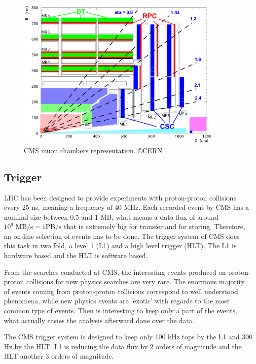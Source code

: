 \begin{figure}[!Hhtbp]
  \begin{center}
    \includegraphics[width=0.9\textwidth]{figs/MuonDetector.png}
    \caption{CMS muon chambers representation. \copyright CERN}
    \label{fig:cmsmuon}
  \end{center}
\end{figure}

\subsection{Trigger}
\label{sec:trigger}

LHC has been designed to provide experiments with proton-proton collisions every 25 ns, meaning a frequency of 40 MHz. Each recorded event by CMS has a nominal size between 0.5 and 1 MB, what means a data flux of around $10^{9}\; \text{MB/s}= 1\text{PB/s}$ that is extremely big for transfer and for storing. Therefore, an on-line selection of events has to be done. The trigger system of CMS does this task in two fold, a level 1 (L1) and a high level trigger (HLT). The L1 is hardware based and the HLT is software based. 

From the searches conducted at CMS, the interesting events produced on proton-proton collisions for new physics searches are very rare. The enormous majority of events coming from proton-proton collisions correspond to well understood phenomena, while new physics events are 'exotic' with regards to the most common type of events. Then is interesting to keep only a part of the events, what actually easies the analysis afterward done over the data. 

The CMS trigger system is designed to keep only 100 kHz tops by the L1 and 300 Hz by the HLT. L1 is reducing the data flux by 2 orders of magnitude and the HLT another 3 orders of magnitude.

